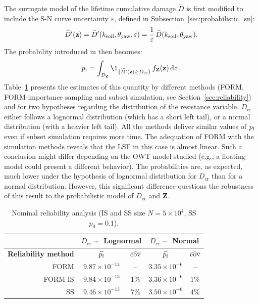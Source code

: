 The surrogate model of the lifetime cumulative damage $\widetilde{D}$ is first modified to include the S-N curve uncertainty $\varepsilon$, defined in Subsection~\ref{sec:probabilistic_sn}:
\begin{equation}
    \widetilde{D}'({\bf z}) = \widetilde{D}'(k_{\mathrm{soil}}, \theta_{\mathrm{yaw}}, \varepsilon) = \frac1\varepsilon \, \widetilde{D}(k_{\mathrm{soil}}, \theta_{\mathrm{yaw}}).
\end{equation} 
The probability introduced in  then becomes: 
\begin{equation}
    \pf = \int_{\iD_\bZ} \1_{\{\widetilde{D}'(\bz) \geq D_{\mathrm{cr}}\}} \, f_\bZ(\bz) \, \dd z \,,
    \label{eq:owt_pf_surrogate}
\end{equation}
Table~\ref{tab:pf_result_table} presents the estimates of this quantity by different methods (FORM, FORM-importance sampling and subset simulation, see Section~\ref{sec:reliability}) and for two hypotheses regarding the distribution of the resistance variable. 
$D_{\mathrm{cr}}$ either follows a lognormal distribution (which has a short left tail), or a normal distribution (with a heavier left tail). 
All the methods deliver similar values of $p_\mathrm{f}$ even if subset simulation requires more time. 
The adequation of FORM with the simulation methods reveals that the LSF in this case is almost linear. 
Such a conclusion might differ depending on the OWT model studied (e.g., a floating model could present a different behavior). 
The probabilities are, as expected, much lower under the hypothesis of lognormal distribution for $D_{\mathrm{cr}}$ than for a normal distribution. 
However, this significant difference questions the robustness of this result to the probabilistic model of $D_{\mathrm{cr}}$ and ${\bf Z}$.  

\begin{table}[h]
    \centering
    \caption{Nominal reliability analysis (IS and SS size $N=5 \times 10^4$, SS $p_0=0.1$).}
    \begin{tabular}{r||c|c|c|c}
              &  \multicolumn{2}{c|}{$D_{\mathrm{cr}} \sim $ \bf Lognormal} & \multicolumn{2}{c}{$D_{\mathrm{cr}} \sim $ \bf Normal}\\
    \hline
    \bf Reliability method & $\widehat{p_\mathrm{f}}$       & $\widehat{\mathrm{cov}}$    & $\widehat{p_\mathrm{f}}$       & $\widehat{\mathrm{cov}}$ \\
    \hline\hline
    FORM      & $9.87 \times 10^{-13}$ & --                    & $3.35 \times 10^{-6}$ & --\\
    \hline
    FORM-IS   & $9.84 \times 10^{-13}$ & $1 \%$                & $3.36 \times 10^{-6}$ & $1 \%$\\
    \hline
    SS        & $9.46 \times 10^{-13}$ & $7 \%$               & $3.50 \times 10^{-6}$ & $4 \%$\\ 
    \end{tabular}
    \label{tab:pf_result_table}
\end{table}


